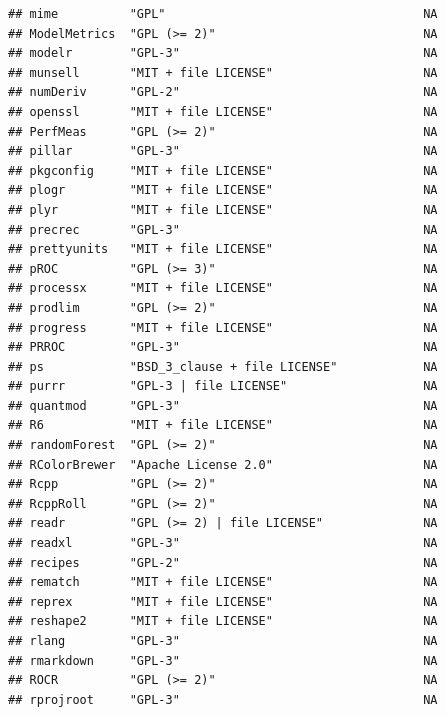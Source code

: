 \documentclass[]{article}
\begin{document}
\begin{verbatim}
## mime          "GPL"                                    NA             
## ModelMetrics  "GPL (>= 2)"                             NA             
## modelr        "GPL-3"                                  NA             
## munsell       "MIT + file LICENSE"                     NA             
## numDeriv      "GPL-2"                                  NA             
## openssl       "MIT + file LICENSE"                     NA             
## PerfMeas      "GPL (>= 2)"                             NA             
## pillar        "GPL-3"                                  NA             
## pkgconfig     "MIT + file LICENSE"                     NA             
## plogr         "MIT + file LICENSE"                     NA             
## plyr          "MIT + file LICENSE"                     NA             
## precrec       "GPL-3"                                  NA             
## prettyunits   "MIT + file LICENSE"                     NA             
## pROC          "GPL (>= 3)"                             NA             
## processx      "MIT + file LICENSE"                     NA             
## prodlim       "GPL (>= 2)"                             NA             
## progress      "MIT + file LICENSE"                     NA             
## PRROC         "GPL-3"                                  NA             
## ps            "BSD_3_clause + file LICENSE"            NA             
## purrr         "GPL-3 | file LICENSE"                   NA             
## quantmod      "GPL-3"                                  NA             
## R6            "MIT + file LICENSE"                     NA             
## randomForest  "GPL (>= 2)"                             NA             
## RColorBrewer  "Apache License 2.0"                     NA             
## Rcpp          "GPL (>= 2)"                             NA             
## RcppRoll      "GPL (>= 2)"                             NA             
## readr         "GPL (>= 2) | file LICENSE"              NA             
## readxl        "GPL-3"                                  NA             
## recipes       "GPL-2"                                  NA             
## rematch       "MIT + file LICENSE"                     NA             
## reprex        "MIT + file LICENSE"                     NA             
## reshape2      "MIT + file LICENSE"                     NA             
## rlang         "GPL-3"                                  NA             
## rmarkdown     "GPL-3"                                  NA             
## ROCR          "GPL (>= 2)"                             NA             
## rprojroot     "GPL-3"                                  NA             

\end{verbatim}
\end{document}
